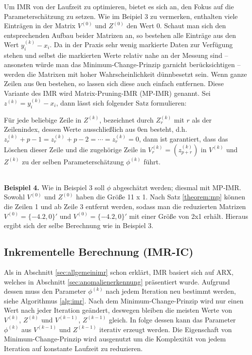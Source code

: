 Um IMR von der Laufzeit zu optimieren, bietet es sich an, den Fokus auf die
Parameterschätzung zu setzen. Wie im Beipiel 3 zu vermerken, enthalten viele
Einträgen in der Matrix $V^{(0)}$ und $Z^{(0)}$ den Wert 0. Schaut man sich den
entsprechenden Aufbau beider Matrizen an, so bestehen alle Einträge aus den
Wert $y^{(k)}_i - x_i$. Da in der Praxis sehr wenig markierte Daten zur
Verfügung stehen und selbst die markierten Werte relativ nahe an der Messung
sind -- ansonsten würde man das Minimum-Change-Prinzip garnicht berücksichtigen
-- werden die Matrixen mit hoher Wahrscheinlichkeit dünnbesetzt sein. Wenn
ganze Zeilen aus 0en bestehen, so lassen sich diese auch einfach entfernen.
Diese Variante des IMR wird Matrix-Pruning-IMR (MP-IMR) genannt. Sei $z^{(k)} =
y^{(k)}_i - x_i$, dann lässt sich folgender Satz formulieren:
\begin{theorem}
    Für jede beliebige Zeile in $Z^{(k)}$, bezeichnet durch $Z^{(k)}_r$ mit $r$
    als der Zeilenindex, dessen Werte ausschließlich aus 0en besteht, d.h.
    $z^{(k)}_r+p-1 = z^{(k)}_r+p-2 = \cdots = z_r^{(k)} = 0$,  dann ist
    garantiert, dass das Löschen dieser Zeile und die zugehörige Zeile in
    $V_r^{(k)} = \left(z^{(k)}_{p+r}\right)$ in $V^{(k)}$ und $Z^{(k)}$ zu der
    selben Parameterschätzung $\phi^{(k)}$ führt.
    \label{theorem:mp}
\end{theorem}
~\\
\textbf{Beispiel 4.} Wie in Beispiel 3 soll $\phi$ abgeschätzt werden; diesmal
mit MP-IMR.  Sowohl $V^{(0)}$ und $Z^{(0)}$ haben die Größe 11 x 1. Nach Satz
\ref{theorem:mp} können die Zeilen 1 und ab Zeile 3 entfernt werden, sodass man
die reduzierten Matrizen $V^{(0)} = \{-4.2, 0\}'$ und $V^{(0)} = \{-4.2, 0\}'$
mit einer Größe von 2x1 erhält. Hieraus ergibt sich der selbe Berechnung wie in
Beispiel 3.
\subsection{Inkrementelle Berechnung (IMR-IC)}
Als in Abschnitt \ref{sec:allgemeinimr} schon erklärt, IMR basiert sich auf ARX,
welches in Abschnitt \ref{sec:anomalienerkennung} präsentiert wurde. Aufgrund
dessen muss den Parameter $\phi^{(k)}$ nach jedem Iteration neu bestimmt
werden, siehe Algorithmus \ref{alg:imr}. Nach dem Minimum-Change-Prinzip wird nur
einen Wert nach jeder Iteration geändert, deswegen bleiben die meisten Werte von 
$V^{(k)}$, $Z^{(k)}$ und $V^{(k-1)}$, $Z^{(k-1)}$ gleich. In folge dessen kann
das Parameter $\phi^{(k)}$ aus $V^{(k-1)}$ und $Z^{(k-1)}$ iterativ erzeugt
werden. Die Eigenschaft von Minimum-Change-Prinzip wird ausgenutzt um die
Komplexität von jedem Iteration auf konstante Laufzeit zu reduzieren. 
